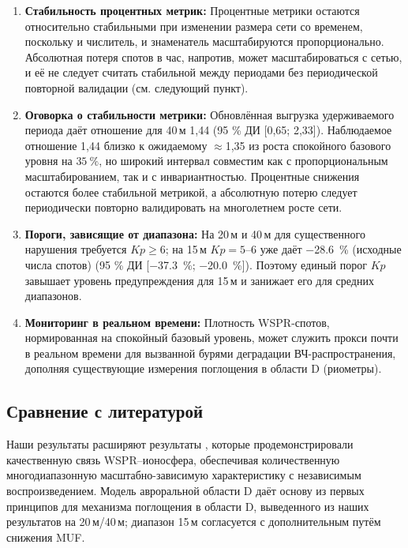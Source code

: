 \documentclass{agujournal2019}
\begin{document}
\begin{enumerate}
	\item \textbf{Стабильность процентных метрик:} Процентные
	      метрики остаются относительно стабильными при изменении размера
	      сети со временем, поскольку и числитель, и знаменатель
	      масштабируются пропорционально. Абсолютная потеря спотов в час,
	      напротив, может масштабироваться с сетью, и её не следует считать стабильной между периодами без периодической повторной валидации
	      (см. следующий пункт).
	\item \textbf{Оговорка о стабильности метрики:} Обновлённая выгрузка
	      удерживаемого периода даёт отношение для 40\,м 1,44 (95 \% ДИ
	      [0,65; 2,33]). Наблюдаемое отношение 1,44 близко к ожидаемому
	      $\approx$1,35 из роста спокойного базового уровня на
	      $\SI{+35}{\percent}$, но широкий интервал совместим как с
	      пропорциональным масштабированием, так и с инвариантностью.
	      Процентные снижения остаются более стабильной метрикой, а
	      абсолютную потерю следует периодически повторно валидировать
	      на многолетнем росте сети.
	\item \textbf{Пороги, зависящие от диапазона:} На 20\,м и 40\,м для
	      существенного нарушения требуется $Kp \ge 6$; на 15\,м
	      $Kp = 5\text{--}6$ уже даёт \SI{-28.6}{\percent} (исходные числа спотов)
	      (95 \% ДИ [\SI{-37.3}{\percent}; \SI{-20.0}{\percent}]). Поэтому
	      единый порог $Kp$ завышает уровень предупреждения для 15\,м
	      и занижает его для средних диапазонов.
	\item \textbf{Мониторинг в реальном времени:} Плотность WSPR-спотов,
	      нормированная на спокойный базовый уровень, может служить
	      прокси почти в реальном времени для вызванной бурями деградации
	      ВЧ-распространения,
	      дополняя существующие измерения поглощения в области D (риометры).
\end{enumerate}

\subsection{Сравнение с литературой}

Наши результаты расширяют результаты \citet{frissell2016}, которые
продемонстрировали качественную связь WSPR--ионосфера, обеспечивая
количественную многодиапазонную масштабно-зависимую характеристику
с независимым воспроизведением. Модель авроральной области D
\citet{themens2021} даёт основу из первых принципов для механизма поглощения
в области D, выведенного из наших результатов на 20\,м/40\,м; диапазон 15\,м
согласуется с дополнительным путём снижения MUF.
\end{document}
